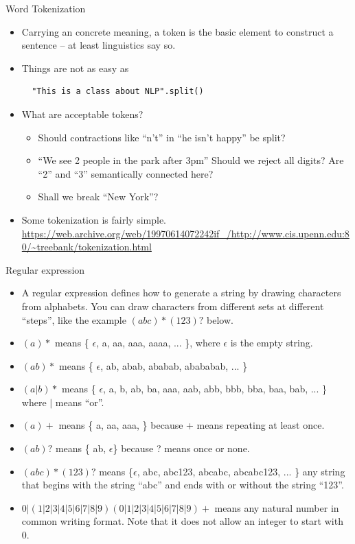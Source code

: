 \documentclass[11pt]{beamer}
\begin{document}
\begin{frame}[fragile]{Word Tokenization}
\begin{itemize}[<+->]
 \item Carrying an concrete meaning, a token is the basic element to construct a sentence -- at least linguistics say so. 
 \item Things are not as easy as 
 \begin{lstlisting}
  "This is a class about NLP".split()
 \end{lstlisting}
 \item What are acceptable tokens?
 \begin{itemize}
  \item Should contractions like ``n't'' in ``he isn't happy'' be split? 
  \item  ``We see 2 people in the park after 3pm'' Should we reject all digits? Are ``2'' and ``3'' semantically connected here? 
  \item Shall we break ``New York''? 
 \end{itemize}
 \item Some tokenization is fairly simple. \url{https://web.archive.org/web/19970614072242if_/http://www.cis.upenn.edu:80/~treebank/tokenization.html}
\end{itemize}
\end{frame}


\begin{frame}{Regular expression}
\begin{itemize}[<+->]
 \item A regular expression defines how to generate a string by drawing characters from alphabets. You can draw characters from different sets at different ``steps'', like the example $(abc)*(123)?$ below. 
 \item $(a)*$ means \{ $\epsilon$, a, aa, aaa, aaaa, ... \}, where $\epsilon$ is the empty string. 
 \item $(ab)*$ means \{ $\epsilon$, ab, abab, ababab, abababab, ... \}
 \item $(a|b)*$ means \{ $\epsilon$, a, b, ab, ba, aaa, aab, abb, bbb, bba, baa,  bab, ... \} where $|$ means ``or''. 
 \item $(a)+$ means \{ a, aa, aaa, \} because + means repeating at least once. 
 \item $(ab)?$ means \{ ab, $\epsilon$\} because ? means once or none. 
 \item $(abc)*(123)?$ means \{$\epsilon$, abc, abc123, abcabc, abcabc123, ... \} any string that begins with the string ``abc'' and ends with or without the string ``123''. 
 \item $0|(1|2|3|4|5|6|7|8|9)(0|1|2|3|4|5|6|7|8|9)+$ means any natural number in common writing format. Note that it does not allow an integer to start with 0. 
\end{itemize} 
\end{frame}
\end{document}
